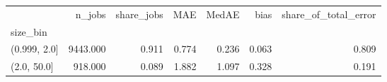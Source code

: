 \begin{tabular}{lrrrrrr}
\toprule
 & n_jobs & share_jobs & MAE & MedAE & bias & share_of_total_error \\
size_bin &  &  &  &  &  &  \\
\midrule
(0.999, 2.0] & 9443.000 & 0.911 & 0.774 & 0.236 & 0.063 & 0.809 \\
(2.0, 50.0] & 918.000 & 0.089 & 1.882 & 1.097 & 0.328 & 0.191 \\
\bottomrule
\end{tabular}
